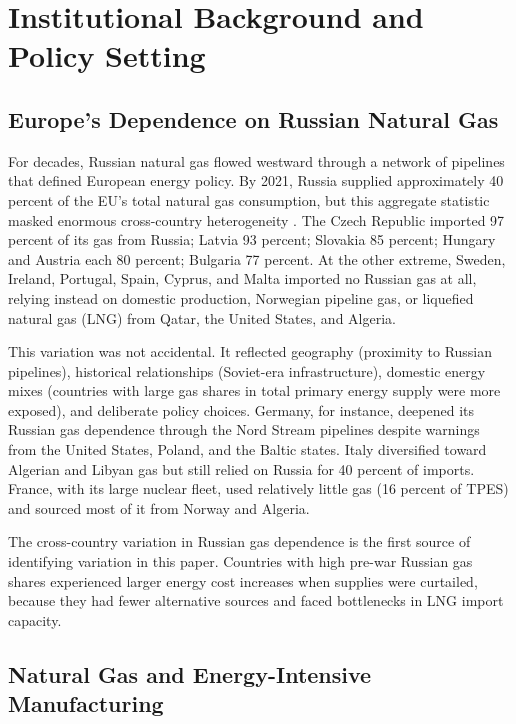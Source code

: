 \documentclass[12pt]{article}
\begin{document}
\section{Institutional Background and Policy Setting}
\label{sec:background}

\subsection{Europe's Dependence on Russian Natural Gas}

For decades, Russian natural gas flowed westward through a network of pipelines that defined European energy policy. By 2021, Russia supplied approximately 40 percent of the EU's total natural gas consumption, but this aggregate statistic masked enormous cross-country heterogeneity \citep{iea2022}. The Czech Republic imported 97 percent of its gas from Russia; Latvia 93 percent; Slovakia 85 percent; Hungary and Austria each 80 percent; Bulgaria 77 percent. At the other extreme, Sweden, Ireland, Portugal, Spain, Cyprus, and Malta imported no Russian gas at all, relying instead on domestic production, Norwegian pipeline gas, or liquefied natural gas (LNG) from Qatar, the United States, and Algeria.

This variation was not accidental. It reflected geography (proximity to Russian pipelines), historical relationships (Soviet-era infrastructure), domestic energy mixes (countries with large gas shares in total primary energy supply were more exposed), and deliberate policy choices. Germany, for instance, deepened its Russian gas dependence through the Nord Stream pipelines despite warnings from the United States, Poland, and the Baltic states. Italy diversified toward Algerian and Libyan gas but still relied on Russia for 40 percent of imports. France, with its large nuclear fleet, used relatively little gas (16 percent of TPES) and sourced most of it from Norway and Algeria.

The cross-country variation in Russian gas dependence is the first source of identifying variation in this paper. Countries with high pre-war Russian gas shares experienced larger energy cost increases when supplies were curtailed, because they had fewer alternative sources and faced bottlenecks in LNG import capacity.

\subsection{Natural Gas and Energy-Intensive Manufacturing}
\end{document}
